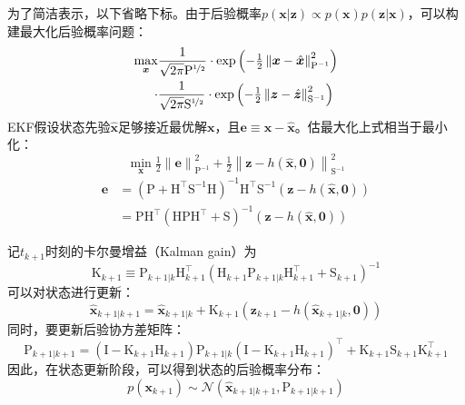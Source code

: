 为了简洁表示，以下省略下标。由于后验概率$p(\bm{x}|\bm{z}) \propto p(\bm{x})p(\bm{z}|\bm{x})$，可以构建最大化后验概率问题：
\begin{equation}
\begin{aligned}
    \max_{\bm{x}}
        &\frac{1}{\sqrt{2\pi}\mathrm{P}^{\nicefrac{1}{2}}}
        \cdot \exp \left( -\tfrac{1}{2}
            \left\| \bm{x}-\hat{\bm{x}} \right\|
            _{\mathrm{P}^{-1}}^2
        \right) \\
    \cdot
        &\frac{1}{\sqrt{2\pi}\mathrm{S}^{\nicefrac{1}{2}}}
        \cdot \exp \left( -\tfrac{1}{2}
            \left\| \bm{z}-\hat{\bm{z}} \right\|
            _{\mathrm{S}^{-1}}^2
        \right)
\end{aligned}
\end{equation}
EKF假设状态先验$\hat{\bm{x}}$足够接近最优解$\bm{x}$，且$\bm{e}\equiv\bm{x}-\hat{\bm{x}}$。估最大化上式相当于最小化：
\begin{equation}
    \min_{\bm{x}} \tfrac{1}{2}
        \left\| \bm{e} \right\|_{{\mathrm{P}}^{-1}}^2 +
    \tfrac{1}{2}
        \left\| \bm{z}-h(\hat{\bm{x}},\bm{0}) \right\|_{\mathrm{S}^{-1}}^2
\end{equation}
\begin{equation}
\begin{aligned}
    \bm{e} &=
    \left( \mathrm{P} + \mathrm{H}^\top\mathrm{S}^{-1}\mathrm{H} \right)^{-1}
    \mathrm{H}^\top\mathrm{S}^{-1}(\bm{z}-h(\hat{\bm{x}},\bm{0}))
    \\
    &= \mathrm{P}\mathrm{H}^\top
    \left( \mathrm{H}\mathrm{P}\mathrm{H}^\top + \mathrm{S} \right)^{-1}
    (\bm{z}-h(\hat{\bm{x}},\bm{0}))
\end{aligned}
\end{equation}

记$t_{k+1}$时刻的卡尔曼增益（Kalman gain）为
\begin{equation}
    \mathrm{K}_{k+1} \equiv
        \mathrm{P}_{k+1|k} \mathrm{H}_{k+1}^\top
        \left(
            \mathrm{H}_{k+1} \mathrm{P}_{k+1|k} \mathrm{H}_{k+1}^\top +
            \mathrm{S}_{k+1}
        \right)^{-1}
\end{equation}
可以对状态进行更新：
\begin{equation}
    \hat{\bm{x}}_{k+1|k+1} =
        \hat{\bm{x}}_{k+1|k} + \mathrm{K}_{k+1}
        (\bm{z}_{k+1}-h(\hat{\bm{x}}_{k+1|k},\bm{0}))
\end{equation}
同时，要更新后验协方差矩阵：
\begin{equation}
    \mathrm{P}_{k+1|k+1} =
        \left( \mathrm{I} - \mathrm{K}_{k+1} \mathrm{H}_{k+1} \right)
        \mathrm{P}_{k+1|k}
        \left( \mathrm{I} - \mathrm{K}_{k+1} \mathrm{H}_{k+1} \right)^\top +
        \mathrm{K}_{k+1} \mathrm{S}_{k+1} \mathrm{K}_{k+1}^\top
\end{equation}
因此，在状态更新阶段，可以得到状态的后验概率分布：
\begin{equation}
    p(\bm{x}_{k+1}) \sim \mathcal{N}(\hat{\bm{x}}_{k+1|k+1},\mathrm{P}_{k+1|k+1})
\end{equation}
